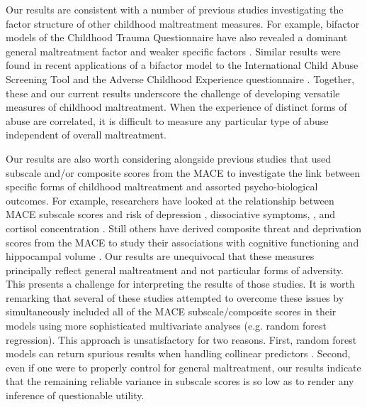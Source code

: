 \documentclass[letterpaper,man,natbib,floatsintext,longtable]{apa6}
\begin{document}
Our results are consistent with a number of previous studies investigating the factor structure of other childhood maltreatment measures. For example, bifactor models of the Childhood Trauma Questionnaire have also revealed a dominant general maltreatment factor and weaker specific factors \citep{spinhoven2014childhood, hollerbach2018main, stagaki2022mediating}. Similar results were found in recent applications of a bifactor model to the International Child Abuse Screening Tool \citep{meinck2021factor} and the Adverse Childhood Experience questionnaire \citep{dobson2021latent}. Together, these and our current results underscore the challenge of developing versatile measures of childhood maltreatment. When the experience of distinct forms of abuse are correlated, it is difficult to measure any particular type of abuse independent of overall maltreatment.  
 
Our results are also worth considering alongside previous studies that used subscale and/or composite scores from the MACE to investigate the link between specific forms of childhood maltreatment and assorted psycho-biological outcomes. For example, researchers have looked at the relationship between MACE subscale scores and risk of depression \citep{gerke2018childhood}, dissociative symptoms, \citep{schalinski2015type}, and cortisol concentration \citep{schalinski2019early}. Still others have derived composite threat and deprivation scores from the MACE to study their associations with cognitive functioning \citep{schalinski2018defining} and hippocampal volume \citep{teicher2018differential}. Our results are unequivocal that these measures principally reflect general maltreatment and not particular forms of adversity. This presents a challenge for interpreting the results of those studies. It is worth remarking that several of these studies attempted to overcome these issues by simultaneously included all of the MACE subscale/composite scores in their models using more sophisticated multivariate analyses (e.g. random forest regression). This approach is unsatisfactory for two reasons. First, random forest models can return spurious results when handling collinear predictors \citep{gregorutti2017correlation}. Second, even if one were to properly control for general maltreatment, our results indicate that the remaining reliable variance in subscale scores is so low as to render any inference of questionable utility.
\end{document}
